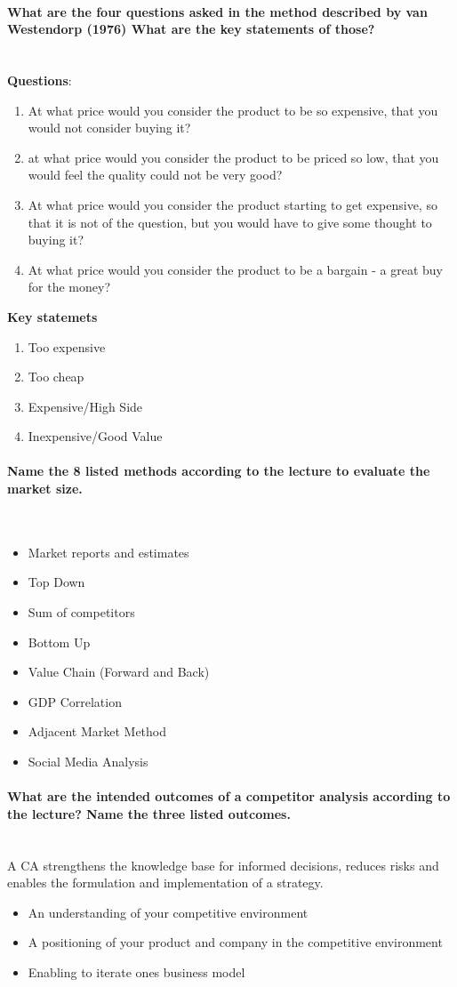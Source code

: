 \documentclass[10pt,a4paper,noendnumber=true]{scrartcl}
\newcommand{\properparagraph}[1]{\paragraph{\textcolor{Emerald}{#1}}\mbox{}\\}
\begin{document}
\properparagraph{What are the four questions asked in the method described by van Westendorp (1976) What are the key statements of those?}
\textbf{Questions}:
\begin{enumerate}
	\item At what price would you consider the product to be so expensive, that you would not consider buying it?
	\item at what price would you consider the product to be priced so low, that you would feel the quality could not be very good?
	\item At what price would you consider the product starting to get expensive, so that it is not of the question, but you would have to give some thought  to buying it?
	\item At what price would you consider the product to be a bargain - a great buy for the money?
\end{enumerate}
\textbf{Key statemets}
\begin{enumerate}
	\item Too expensive
	\item Too cheap
	\item Expensive/High Side
	\item Inexpensive/Good Value
\end{enumerate}
\properparagraph{Name the 8 listed methods according to the lecture to evaluate the market size.}
\begin{itemize}
	\item Market reports and estimates
	\item Top Down
	\item Sum of competitors
	\item Bottom Up
	\item Value Chain (Forward and Back)
	\item GDP Correlation
	\item Adjacent Market Method
	\item Social Media Analysis
\end{itemize}
\properparagraph{What are the intended outcomes of a competitor analysis according to the lecture? Name the three listed outcomes.}
A CA strengthens the knowledge base for informed decisions, reduces risks and enables the formulation and implementation of a strategy.
\begin{itemize}
	\item An understanding of your competitive environment
	\item A positioning of your product and company in the competitive environment
	\item Enabling to iterate ones business model
\end{itemize}
\end{document}
